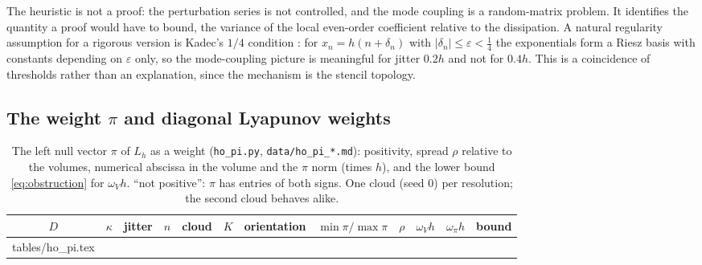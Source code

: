 \documentclass[11pt,a4paper]{article}
\makeatletter
\theoremstyle{plain}
\theoremstyle{definition}
\theoremstyle{remark}
\numberwithin{equation}{section}
\newcommand{\inputrows}[1]{\@@input #1 }%
\makeatother
\begin{document}
The heuristic is not a proof: the perturbation series is not controlled, and the mode coupling is a random-matrix problem. It identifies the quantity a proof would have to bound, the variance of the local even-order coefficient relative to the dissipation. A natural regularity assumption for a rigorous version is Kadec's $1/4$ condition \cite{Kadec1964}: for $x_n=h(n+\delta_n)$ with $|\delta_n|\le\varepsilon<\frac14$ the exponentials form a Riesz basis with constants depending on $\varepsilon$ only, so the mode-coupling picture is meaningful for jitter $0.2h$ and not for $0.4h$. This is a coincidence of thresholds rather than an explanation, since the mechanism is the stencil topology.

\subsection{The weight \texorpdfstring{$\pi$}{pi} and diagonal Lyapunov weights}\label{sec:numpi}

\begin{table}[p]
\centering
\caption{The left null vector $\pi$ of $L_h$ as a weight (\texttt{ho\_pi.py}, \texttt{data/ho\_pi\_*.md}): positivity, spread $\rho$ relative to the volumes, numerical abscissa in the volume and the $\pi$ norm (times $h$), and the lower bound \eqref{eq:obstruction} for $\omega_Vh$. ``not positive'': $\pi$ has entries of both signs. One cloud (seed 0) per resolution; the second cloud behaves alike.}\label{tab:pi}
\scriptsize
\begin{tabular}{cccccccccccc}
\toprule
$D$ & $\kappa$ & jitter & $n$ & cloud & $K$ & orientation & $\min\pi/\max\pi$ & $\rho$ & $\omega_Vh$ & $\omega_\pi h$ & bound\\
\midrule
\inputrows{tables/ho_pi.tex}
\bottomrule
\end{tabular}
\end{table}
\end{document}
